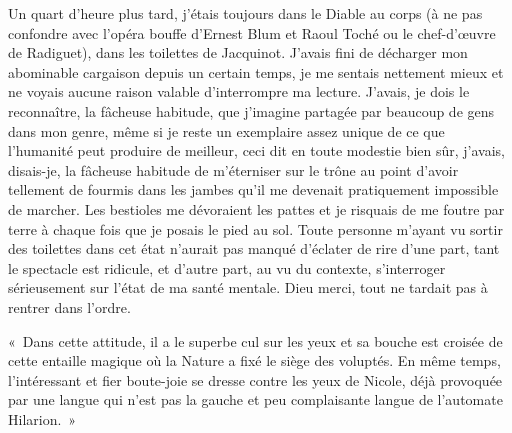 %
%
Un quart d’heure plus tard, j’étais toujours dans le Diable au corps (à ne pas confondre avec l’opéra bouffe d’Ernest Blum et Raoul Toché ou le chef-d’œuvre de Radiguet), dans les toilettes de Jacquinot. J’avais fini de décharger mon abominable cargaison depuis un certain temps, je me sentais nettement mieux et ne voyais aucune raison valable d’interrompre ma lecture. J’avais, je dois le reconnaître, la fâcheuse habitude, que j’imagine partagée par beaucoup de gens dans mon genre, même si je reste un exemplaire assez unique de ce que l’humanité peut produire de meilleur, ceci dit en toute modestie bien sûr, j’avais, disais-je, la fâcheuse habitude de m’éterniser sur le trône au point d’avoir tellement de fourmis dans les jambes qu’il me devenait pratiquement impossible de marcher. Les bestioles me dévoraient les pattes et je risquais de me foutre par terre à chaque fois que je posais le pied au sol. Toute personne m’ayant vu sortir des toilettes dans cet état n’aurait pas manqué d’éclater de rire d’une part, tant le spectacle est ridicule, et d’autre part, au vu du contexte, s’interroger sérieusement sur l’état de ma santé mentale. Dieu merci, tout ne tardait pas à rentrer dans l’ordre.

%
«~Dans cette attitude, il a le superbe cul sur les yeux et sa bouche est croisée de cette entaille magique où la Nature a fixé le siège des voluptés. En même temps, l’intéressant et fier boute-joie se dresse contre les yeux de Nicole, déjà provoquée par une langue qui n’est pas la gauche et peu complaisante langue de l’automate Hilarion.~»

